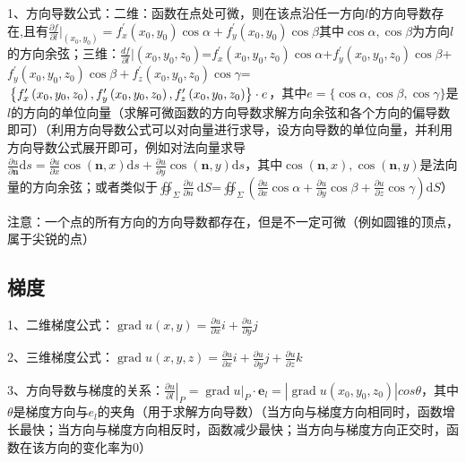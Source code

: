 1、方向导数公式：二维：函数在点处可微，则在该点沿任一方向$l$的方向导数存在,且有$\frac{\partial f}{\partial l}|_{\left(x_{0}, y_{0}\right)}= f_{x}^{\prime}(x_{0},y_{0}) \cos \alpha+f_{y}^{\prime}\left(x_{0}, y_{0}\right) \cos \beta$其中$\cos \alpha, \cos \beta$为方向$l$的方向余弦；三维：$\frac{d f}{\partial l}|{\left(x_{0}, y_{0}, z_{0}\right)} $=$f_{x}^{\prime}\left(x_{0}, y_{0}, z_{0}\right) \cos \alpha$+$f_{y}^{\prime}\left(x_{0}, y_{0}, z_{0}\right) \cos \beta$+$f_{y}^{\prime}\left(x_{0}, y_{0}, z_{0}\right) \cos \beta+f_{z}^{\prime}\left(x_{0}, y_{0}, z_{0}\right) \cos \gamma$=$\newline\left\{f_{x}^{\prime}\left(x_{0}, y_{0}, z_{0}\right), f_{y}^{\prime}\left(x_{0}, y_{0}, z_{0}\right), f_{z}^{\prime}\left(x_{0}, y_{0}, z_{0}\right)\right\} \cdot e$，其中$e=\{\cos \alpha, \cos \beta, \cos \gamma\}$是$l$的方向的单位向量（求解可微函数的方向导数求解方向余弦和各个方向的偏导数即可）（利用方向导数公式可以对向量进行求导，设方向导数的单位向量，并利用方向导数公式展开即可，例如对法向量求导$\frac{\partial u}{\partial \boldsymbol{n}} \mathrm{d} s=\frac{\partial u}{\partial x} \cos (\boldsymbol{n}, x) \mathrm{d} s+\frac{\partial u}{\partial y} \cos (\boldsymbol{n}, y) \mathrm{d} s$，其中$\cos (\boldsymbol{n}, x) ,\cos (\boldsymbol{n}, y)$是法向量的方向余弦；或者类似于$\oiint_{\Sigma} \frac{\partial u}{\partial n} \mathrm{~d} S$=$\oiint_{\Sigma}(\frac{\partial u}{\partial x} \cos \alpha+\frac{\partial u}{\partial y} \cos \beta+\frac{\partial u}{\partial z} \cos \gamma) \mathrm{d} S$）

注意：一个点的所有方向的方向导数都存在，但是不一定可微（例如圆锥的顶点，属于尖锐的点）



\subsection{梯度}

1、二维梯度公式：$\operatorname{grad} u(x, y)=\frac{\partial u}{\partial x} i+\frac{\partial u}{\partial y} j$

2、三维梯度公式：$\operatorname{grad} u(x, y, z)=\frac{\partial u}{\partial x} i+\frac{\partial u}{\partial y} j+\frac{\partial u}{\partial z} k$

3、方向导数与梯度的关系：$\left.\frac{\partial u}{\partial{l}}\right|_{P}=\left.\operatorname{grad} u\right|_{P} \cdot \boldsymbol{e}_{l}=|\operatorname{grad} u(x_0, y_0, z_0) |cos \theta$，其中$\theta$是梯度方向与$e_l$的夹角（用于求解方向导数）（当方向与梯度方向相同时，函数增长最快；当方向与梯度方向相反时，函数减少最快；当方向与梯度方向正交时，函数在该方向的变化率为0）

